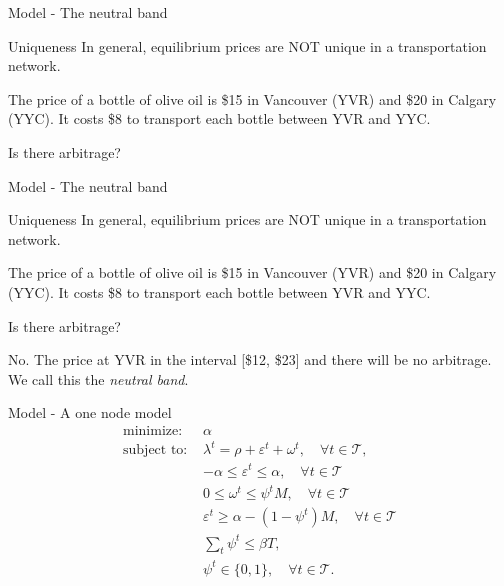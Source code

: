 \documentclass[aspectratio = 169]{beamer}
\newcommand{\T}{\mathcal{T}}
\begin{document}
\begin{frame}{Model - The neutral band}
\begin{alertblock}{Uniqueness}
{In general, equilibrium prices are NOT unique in a transportation network.}\end{alertblock}
\begin{example}
The price of a bottle of olive oil is \$15 in Vancouver (YVR) and \$20 in Calgary (YYC). It costs \$8 to transport each bottle between YVR and YYC.
\end{example}
Is there arbitrage? 
\end{frame}

\begin{frame}{Model - The neutral band}
\begin{alertblock}{Uniqueness}
{In general, equilibrium prices are NOT unique in a transportation network.}\end{alertblock}
\begin{example}
The price of a bottle of olive oil is \$15 in Vancouver (YVR) and \$20 in Calgary (YYC). It costs \$8 to transport each bottle between YVR and YYC.
\end{example}
Is there arbitrage?

No. The price at YVR in the interval [\$12, \$23] and there will be no arbitrage. We call this the \emph{neutral band}.
\end{frame}





\begin{frame}{Model - A one node model}
\begin{align*}
\text{minimize: } &\alpha\\\label{2}
\text{subject to: } &\lambda^t = \rho + \varepsilon^t +\omega^t, \quad \forall t\in\T,\\
&-\alpha\leq\varepsilon^t \leq \alpha,\quad \forall t\in \T\\
&0\leq\omega^t\leq \psi^t M,\quad \forall t\in\T\\
&\varepsilon^t \geq \alpha - (1-\psi^t) M,\quad \forall t\in \T\\
&\sum_t \psi^t \leq \beta T,\\
&\psi^t \in\{0,1\}, \quad \forall t\in \T.
\end{align*}
\end{frame}
\end{document}
